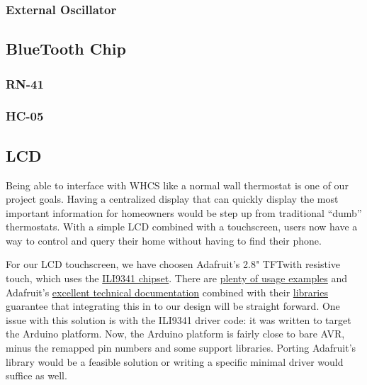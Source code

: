 \subsubsection{External Oscillator}

\subsection{BlueTooth Chip}

\subsubsection{RN-41}

\subsubsection{HC-05}

\subsection{LCD}
Being able to interface with WHCS like a normal wall thermostat is one of our
project goals. Having a centralized display that can quickly display the most
important information for homeowners would be step up from traditional ``dumb''
thermostats. With a simple LCD combined with a touchscreen, users now have a
way to control and query their home without having to find their phone.

For our LCD touchscreen, we have choosen Adafruit's 2.8" TFT\footnotemark with
resistive touch, which uses the \href{}{ILI9341 chipset}. There are
\href{https://github.com/adafruit/Adafruit_ILI9341/tree/master/examples}{plenty
of usage examples} and Adafruit's
\href{https://learn.adafruit.com/adafruit-2-dot-8-color-tft-touchscreen-breakout-v2}{excellent
technical documentation} combined with their
\href{https://github.com/adafruit/Adafruit_ILI9341}{libraries} guarantee that
integrating this in to our design will be straight forward. One issue with this
solution is with the ILI9341 driver code: it was written to target the Arduino
platform. Now, the Arduino platform is fairly close to bare AVR, minus the
remapped pin numbers and some support libraries. Porting Adafruit's library
would be a feasible solution or writing a specific minimal driver would suffice
as well.


